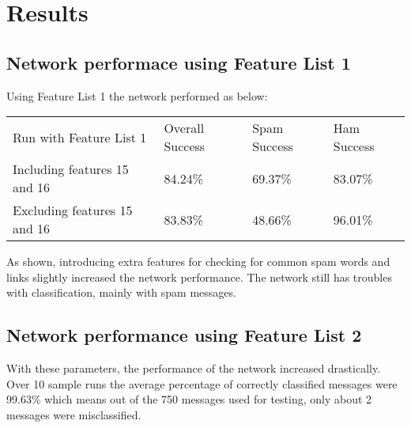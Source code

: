 
\section{Results}
  \subsection{Network performace using Feature List 1}
  \label{sec:initialresults}
    Using Feature List 1 the network performed as below:
    \begin{table}[H]
      \begin{tabular}{llll}
        Run with Feature List 1      & Overall Success & Spam Success & Ham Success \\
        Including features 15 and 16 & 84.24\%         & 69.37\%      & 83.07\%     \\
        Excluding features 15 and 16 & 83.83\%         & 48.66\%      & 96.01\%    
      \end{tabular}
    \end{table}
    As shown, introducing extra features for checking for common spam words and
    links slightly increased the network performance. The network still has
    troubles with classification, mainly with spam messages.

  \subsection{Network performance using Feature List 2}
  \label{sec:reworkedresults}
    With these parameters, the performance of the network increased
    drastically. Over 10 sample runs the average percentage of correctly
    classified messages were 99.63\% which means out of the 750 messages used
    for testing, only about 2 messages were misclassified. 

